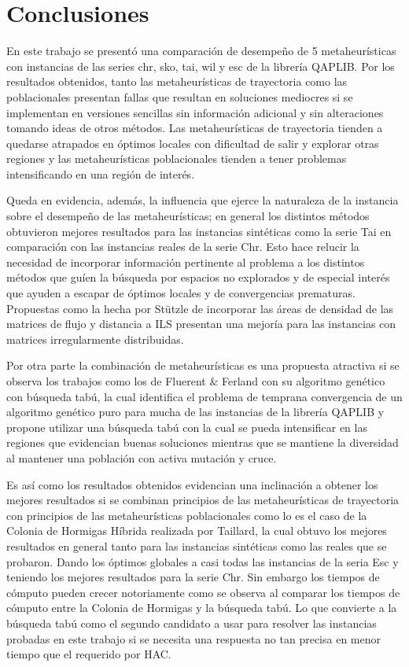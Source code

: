 \documentclass{ci5652}
\begin{document}
\section*{Conclusiones}

En este trabajo se presentó una comparación de desempeño de 5 metaheurísticas con instancias de las series chr, sko, tai, wil y esc de la librería QAPLIB. Por los resultados obtenidos, tanto las metaheurísticas de trayectoria como las poblacionales presentan fallas que resultan en soluciones mediocres si se implementan en versiones sencillas sin información adicional y sin alteraciones tomando ideas de otros métodos. Las metaheurísticas de trayectoria tienden a quedarse atrapados en óptimos locales con dificultad de salir y explorar otras regiones y las metaheurísticas poblacionales tienden a tener problemas intensificando en una región de interés.

Queda en evidencia, además, la influencia que ejerce la naturaleza de la instancia sobre el desempeño de las metaheurísticas; en general los distintos métodos obtuvieron mejores resultados para las instancias sintéticas como la serie Tai en comparación con las instancias reales de la serie Chr. Esto hace relucir la necesidad de incorporar información pertinente al problema a los distintos métodos que guíen la búsqueda por espacios no explorados y de especial interés que ayuden a escapar de óptimos locales y de convergencias prematuras. Propuestas como la hecha por Stützle de incorporar las áreas de densidad de las matrices de flujo y distancia a ILS presentan una mejoría para las instancias con matrices irregularmente distribuidas.

Por otra parte la combinación de metaheurísticas es una propuesta atractiva si se observa los trabajos como los de Fluerent \& Ferland con su algoritmo genético con búsqueda tabú, la cual identifica el problema de temprana convergencia de un algoritmo genético puro para mucha de las instancias de la librería QAPLIB y propone utilizar una búsqueda tabú con la cual se pueda intensificar en las regiones que evidencian buenas soluciones mientras que se mantiene la diversidad al mantener una población con activa mutación y cruce.

Es así como los resultados obtenidos evidencian una inclinación a obtener los mejores resultados si se combinan principios de las metaheurísticas de trayectoria con principios de las metaheurísticas poblacionales como lo es el caso de la Colonia de Hormigas Híbrida realizada por Taillard, la cual obtuvo los mejores resultados en general tanto para las instancias sintéticas como las reales que se probaron. Dando los óptimos globales a casi todas las instancias de la seria Esc y teniendo los mejores resultados para la serie Chr. Sin embargo los tiempos de cómputo pueden crecer notoriamente como se observa al comparar los tiempos de cómputo entre la Colonia de Hormigas y la búsqueda tabú. Lo que convierte a la búsqueda tabú como el segundo candidato a usar para resolver las instancias probadas en este trabajo si se necesita una respuesta no tan precisa en menor tiempo que el requerido por HAC. 
\end{document}
